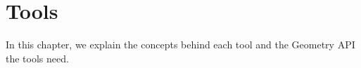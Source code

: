 \chapter{Tools}

In this chapter, we explain the concepts behind each tool and the Geometry API the tools need.